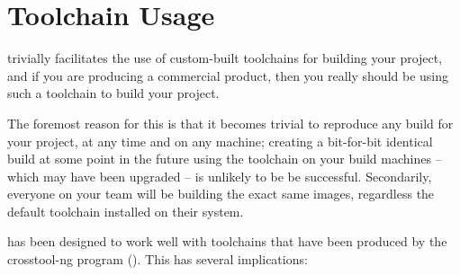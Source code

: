 %
%
%
%
\chapter{Toolchain Usage}\label{chap:toolchain-usage}

\lmsbw trivially facilitates the use of custom-built toolchains for
building your project, and if you are producing a commercial product,
then you really should be using such a toolchain to build your
project.

The foremost reason for this is that it becomes trivial to reproduce
any build for your project, at any time and on any machine; creating a
bit-for-bit identical build at some point in the future using the
toolchain on your build machines -- which may have been upgraded -- is
unlikely to be be successful.  Secondarily, everyone on your team will
be building the exact same images, regardless the default toolchain
installed on their system.

\lmsbw has been designed to work well with toolchains that have been
produced by the crosstool-ng program
().  This has several implications:

